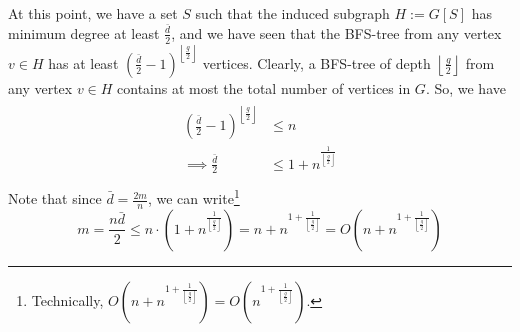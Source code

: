 \documentclass[9pt]{article}
\begin{document}
At this point, we have a set $S$ such that the induced subgraph $H := G[S]$ has minimum degree
at least $\frac{\bar{d}}{2}$, and we have seen that the BFS-tree from any vertex $v \in H$ has
at least $\left( \frac{\bar{d}}{2} - 1 \right)^{\left\lfloor \frac{g}{2} \right\rfloor}$ vertices.
Clearly, a BFS-tree of depth $\left\lfloor \frac{g}{2} \right\rfloor$ from any vertex $v \in H$
contains at most the total number of vertices in $G$. So, we have
\begin{align}
    \begin{split}
        \left( \frac{\bar{d}}{2} - 1 \right)^{\left\lfloor \frac{g}{2} \right\rfloor} &\leq n \\
        \implies \frac{\bar{d}}{2} &\leq 1 + n^{\frac{1}{\left\lfloor \frac{g}{2} \right\rfloor}} \\
    \end{split}
\end{align}
Note that since $\bar{d} = \frac{2m}{n}$, we can write\footnote{Technically,
$O \left( n + n^{1 + \frac{1}{\left\lfloor \frac{g}{2} \right\rfloor}} \right)
= O \left( n^{1 + \frac{1}{\left\lfloor \frac{g}{2} \right\rfloor}} \right)$.}
\begin{equation}
    m = \frac{n \bar{d}}{2} \leq n \cdot \left( 1 + n^{\frac{1}{\left\lfloor \frac{g}{2} \right\rfloor}} \right)
    = n + n^{1 + \frac{1}{\left\lfloor \frac{g}{2} \right\rfloor}}
    = O \left( n + n^{1 + \frac{1}{\left\lfloor \frac{g}{2} \right\rfloor}} \right)
\end{equation}
\end{document}

